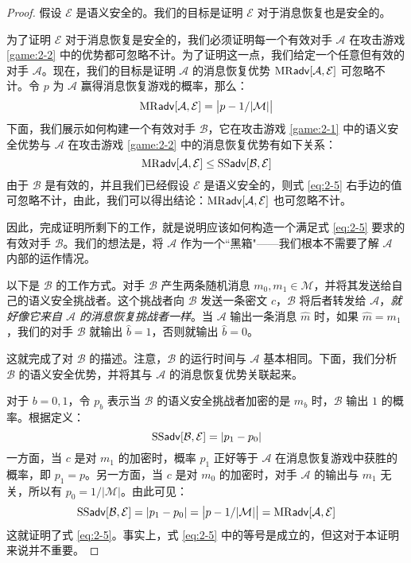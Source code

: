 \begin{proof}
假设 $\mathcal{E}$ 是语义安全的。我们的目标是证明 $\mathcal{E}$ 对于消息恢复也是安全的。

为了证明 $\mathcal{E}$ 对于消息恢复是安全的，我们必须证明每一个有效对手 $\mathcal{A}$ 在攻击游戏 \ref{game:2-2} 中的优势都可忽略不计。为了证明这一点，我们给定一个任意但有效的对手 $\mathcal{A}$。现在，我们的目标是证明 $\mathcal{A}$ 的消息恢复优势 ${\rm MR\mathsf{adv}}[\mathcal{A},\mathcal{E}]$ 可忽略不计。令 $p$ 为 $\mathcal{A}$ 赢得消息恢复游戏的概率，那么：
\[
{\rm MR\mathsf{adv}}[\mathcal{A},\mathcal{E}]=
\big\lvert
p-1/|\mathcal{M}|
\big\rvert
\]
下面，我们展示如何构建一个有效对手 $\mathcal{B}$，它在攻击游戏 \ref{game:2-1} 中的语义安全优势与 $\mathcal{A}$ 在攻击游戏 \ref{game:2-2} 中的消息恢复优势有如下关系：
\begin{equation}\label{eq:2-5}
{\rm MR\mathsf{adv}}[\mathcal{A},\mathcal{E}]
\leq
{\rm SS\mathsf{adv}}[\mathcal{B},\mathcal{E}]
\end{equation}
由于 $\mathcal{B}$ 是有效的，并且我们已经假设 $\mathcal{E}$ 是语义安全的，则式 \ref{eq:2-5} 右手边的值可忽略不计，由此，我们可以得出结论：${\rm MR\mathsf{adv}}[\mathcal{A},\mathcal{E}]$ 也可忽略不计。

因此，完成证明所剩下的工作，就是说明应该如何构造一个满足式 \ref{eq:2-5} 要求的有效对手 $\mathcal{B}$。我们的想法是，将 $\mathcal{A}$ 作为一个``黑箱"——我们根本不需要了解 $\mathcal{A}$ 内部的运作情况。

以下是 $\mathcal{B}$ 的工作方式。对手 $\mathcal{B}$ 产生两条随机消息 $m_0,m_1\in\mathcal{M}$，并将其发送给自己的语义安全挑战者。这个挑战者向 $\mathcal{B}$ 发送一条密文 $c$，$\mathcal{B}$ 将后者转发给 $\mathcal{A}$，\emph{就好像它来自 $\mathcal{A}$ 的消息恢复挑战者一样}。当 $\mathcal{A}$ 输出一条消息 $\hat m$ 时，如果 $\hat m=m_1$，我们的对手 $\mathcal{B}$ 就输出 $\hat b=1$，否则就输出 $\hat b=0$。

这就完成了对 $\mathcal{B}$ 的描述。注意，$\mathcal{B}$ 的运行时间与 $\mathcal{A}$ 基本相同。下面，我们分析 $\mathcal{B}$ 的语义安全优势，并将其与 $\mathcal{A}$ 的消息恢复优势关联起来。

对于 $b=0,1$，令 $p_b$ 表示当 $\mathcal{B}$ 的语义安全挑战者加密的是 $m_b$ 时，$\mathcal{B}$ 输出 $1$ 的概率。根据定义：
\[
{\rm SS\mathsf{adv}}[\mathcal{B},\mathcal{E}]
=
|p_1-p_0|
\]
一方面，当 $c$ 是对 $m_1$ 的加密时，概率 $p_1$ 正好等于 $\mathcal{A}$ 在消息恢复游戏中获胜的概率，即 $p_1=p$。另一方面，当 $c$ 是对 $m_0$ 的加密时，对手 $\mathcal{A}$ 的输出与 $m_1$ 无关，所以有 $p_0=1/|\mathcal M|$。由此可见：
\[
{\rm SS\mathsf{adv}}[\mathcal{B},\mathcal{E}]
=
|p_1-p_0|
=
\big\lvert
p-1/|\mathcal{M}|
\big\rvert
=
{\rm MR\mathsf{adv}}[\mathcal{A},\mathcal{E}]
\]
这就证明了式 \ref{eq:2-5}。事实上，式 \ref{eq:2-5} 中的等号是成立的，但这对于本证明来说并不重要。
\end{proof}

